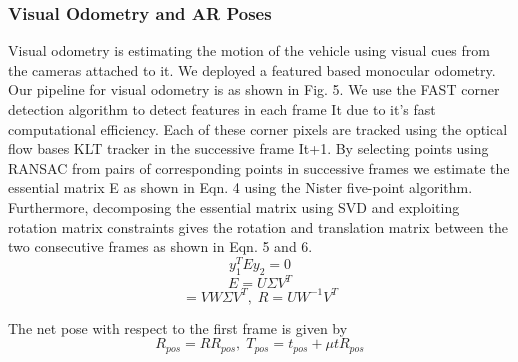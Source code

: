 \documentclass[conference]{IEEEtran}
\begin{document}
\subsubsection{Visual Odometry and AR Poses}
Visual odometry is estimating the motion of the vehicle using visual cues from the cameras attached to it. We deployed a featured based monocular odometry. Our  pipeline for visual odometry is as shown in Fig. 5. We use the FAST corner detection algorithm \cite{1}\cite{2} to detect features in each frame It due to it’s fast computational efficiency. Each of these corner pixels are tracked using the optical flow bases KLT tracker \cite{3} in the successive frame It+1. By selecting points using RANSAC from pairs of corresponding points in successive frames we estimate the essential matrix E as shown in Eqn. 4 using the Nister five-point algorithm\cite{4}. Furthermore, decomposing the essential matrix using SVD and exploiting rotation matrix constraints gives the rotation and translation matrix between the two consecutive frames as shown in Eqn. 5 and 6.
\begin{equation}
y_1^T E y_2 = 0
\end{equation}
\begin{equation}
E = U \Sigma V^T
\end{equation}
\begin{equation}
  [t] = V W \Sigma V^T ,\; R = U W^{-1}V^T
\end{equation}

The net pose with respect to the first frame is given by 
\begin{equation}
R_{pos} = R R_{pos}, \; T_{pos} = t_{pos} +\mu t R_{pos}
\end{equation}

\end{document}
